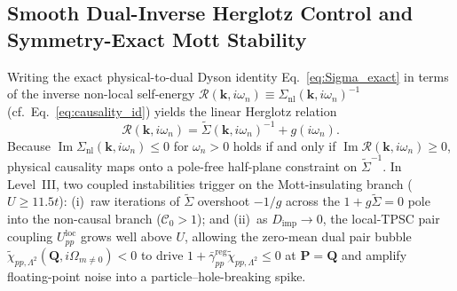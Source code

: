 \documentclass[11pt,a4paper]{article}
\numberwithin{equation}{section}
\theoremstyle{plain}
\theoremstyle{definition}
\providecommand{\vk}{\mathbf{k}}
\providecommand{\vP}{\mathbf{P}}
\providecommand{\vQ}{\mathbf{Q}}
\providecommand{\im}{\operatorname{Im}}
\begin{document}
\subsection{Smooth Dual-Inverse Herglotz Control and Symmetry-Exact Mott Stability}
\label{sec:l4_herglotz}

Writing the exact physical-to-dual Dyson identity Eq.~\eqref{eq:Sigma_exact} in terms of
the inverse non-local self-energy $\mathcal{R}(\vk, i\omega_n) \equiv \Sigma_{\mathrm{nl}}(\vk, i\omega_n)^{-1}$
(cf.\ Eq.~\eqref{eq:causality_id}) yields the linear Herglotz relation
\begin{equation}
    \mathcal{R}(\vk, i\omega_n)
    = \tilde{\Sigma}(\vk, i\omega_n)^{-1} + g(i\omega_n).
    \label{eq:l4_herglotz_id}
\end{equation}
Because $\im\Sigma_{\mathrm{nl}}(\vk, i\omega_n) \le 0$ for $\omega_n > 0$ holds if and
only if $\im\mathcal{R}(\vk, i\omega_n) \ge 0$, physical causality maps onto a pole-free
half-plane constraint on $\tilde{\Sigma}^{-1}$. In Level~III, two coupled instabilities
trigger on the Mott-insulating branch ($U \ge 11.5t$): (i)~raw iterations of
$\tilde{\Sigma}$ overshoot $-1/g$ across the $1 + g\tilde{\Sigma} = 0$ pole into the
non-causal branch ($\mathcal{C}_0 > 1$); and (ii)~as $D_{\mathrm{imp}} \to 0$, the
local-TPSC pair coupling $U_{pp}^{\mathrm{loc}}$ grows well above $U$, allowing the
zero-mean dual pair bubble $\tilde{\chi}_{pp,\Lambda^2}(\vQ, i\Omega_{m \neq 0}) < 0$ to
drive $1 + \bar{\gamma}_{pp}^{\mathrm{reg}}\tilde{\chi}_{pp,\Lambda^2} \le 0$ at
$\vP = \vQ$ and amplify floating-point noise into a particle--hole-breaking spike.
\end{document}
